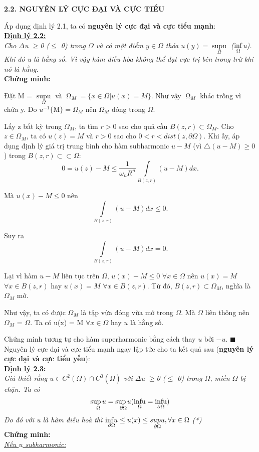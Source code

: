 \begin{center}
\textbf{2.2. NGUYÊN LÝ CỰC ĐẠI VÀ CỰC TIỂU}
\end{center}

Áp dụng định lý 2.1, ta có \textbf{nguyên lý cực đại và cực tiểu mạnh}:
\\
\textbf{\underline{Định lý 2.2:}}
\\
\textit{Cho $\Delta$u $\geq$0 ($\leq$ 0) trong $\Omega$ và có một điểm $y\in\Omega$ thỏa $u(y) = \mathop {\sup u}\limits_\Omega $ ($\mathop {{\rm{inf}}}\limits_\Omega$u). Khi đó u là hằng số. Vì vậy hàm điều hòa không thể đạt cực trị bên trong trừ khi nó là hằng.}
\\
\textbf{Chứng minh:}

Đặt M = $\mathop {\sup u}\limits_\Omega$ và $\mathop \Omega \nolimits_M = \lbrace x \in\Omega | u(x)=M \rbrace$. Như vậy $\mathop \Omega \nolimits_M $   khác trống vì chứa y. Do $u^{-1}\lbrace$M$\rbrace = \Omega_M$ nên $\Omega_M$ đóng trong $\Omega$.

Lấy z bất kỳ trong $\Omega_M$, ta tìm $r > 0$ sao cho quả cầu $B(z,r) \subset\Omega_M$. Cho $z\in\Omega_M$, ta có $u(z) = M$ và $r > 0$ sao cho $0 < r < dist(z,\partial\Omega)$. Khi ấy, áp dụng định lý giá trị trung bình cho hàm subharmonic $u - M$ (vì $\bigtriangleup(u-M) \geq 0$)
trong $B(z,r)\subset\subset\Omega$: 
\[0 = u(z) - M \leq \frac{1}{\omega_n R^n} \int\limits_{B(z,r)} {(u - M)dx}.\]

Mà $u(x) - M \leq 0$ nên \[\int\limits_{B(z,r)} {(u - M)dx}\leq 0.\]

Suy ra \[\int\limits_{B(z,r)} {(u - M)dx}=0.\]

Lại vì hàm $u - M$ liên tục trên $\Omega$, $u(x) - M \leq 0$ $\forall x \in\Omega$ nên $u(x) = M$   $\forall x \in B(z,r)$ hay $u(x) = M$ $\forall x \in B(z,r)$. Từ đó, $B(z,r) \subset\Omega_M $, nghĩa là $\Omega_M$ mở.

Như vậy, ta có được $\Omega_M$ là tập vừa đóng vừa mở trong $\Omega$. Mà $\Omega$ liên thông nên $\Omega_M $ = $\Omega$. Ta có u(x) = M $\forall x \in\Omega$ hay $u$ là hằng số.

Chứng minh tương tự cho hàm superharmonic bằng cách thay $u$ bởi $-u$. $\blacksquare$
\\

Nguyên lý cực đại và cực tiểu mạnh ngay lập tức cho ta kết quả sau (\textbf{nguyên lý cực đại và cực tiểu yếu}):
\\
\textbf{\underline{Định lý 2.3}:}
\\
\textit{Giả thiết rằng $u \in C^2 \left( \Omega  \right) \cap C^0 (\overline\Omega)$ với $\Delta$u $\geq$0 ($\leq$ 0) trong $\Omega$, miền $\Omega$ bị chặn. Ta có
\[\mathop {\sup u}\limits_\Omega   = \mathop {\sup u}\limits_{\partial \Omega }  (\mathop {{\rm{inf u}}}\limits_\Omega   = \mathop {{\rm{inf u}}}\limits_{\partial \Omega } )\]
Do đó với u là hàm điều hoà thì $\mathop{{\rm{inf}}u}\limits_{\partial\Omega } \leq u(x) \leq \mathop {sup u}\limits_{\partial \Omega }, \forall{x} \in \Omega$ (*)}
\\
\textbf{Chứng minh:}
\\
\underline{\textit{Nếu $u$ subharmonic:}} 

